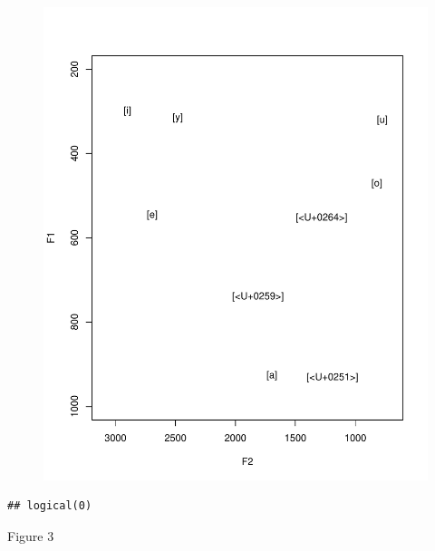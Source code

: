 \documentclass[man, fleqn, noextraspace]{apa6}
\begin{document}
\begin{figure}
\centering
\includegraphics{Vowel_v2_files/figure-latex/figure3-1.pdf}
\caption{}
\end{figure}

\begin{verbatim}
## logical(0)
\end{verbatim}

Figure 3
\end{document}
